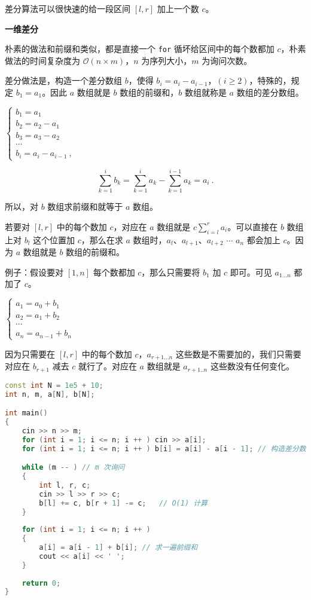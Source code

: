 
差分算法可以很快速的给一段区间 $[l, r]$ 加上一个数 $c$。

\textbf{一维差分}

朴素的做法和前缀和类似，都是直接一个 \verb|for| 循坏给区间中的每个数都加 $c$，朴素做法的时间复杂度为 $\mathcal{O}(n \times m)$，$n$ 为序列大小，$m$ 为询问次数。

差分做法是，构造一个差分数组 $b$，使得 $b_i = a_i - a_{i - 1}$，$(i \geq 2)$，特殊的，规定 $b_1 = a_1$。因此 $a$ 数组就是 $b$ 数组的前缀和，$b$ 数组就称是 $a$ 数组的差分数组。

$\begin{cases}
b_1 = a_1 \\
b_2 = a_2 - a_1 \\
b_3 = a_3 - a_2 \\
\cdots \\
b_i = a_i - a_{i - 1}~,
\end{cases}$

\begin{equation}
\sum^i_{k = 1}b_k = \sum^{i}_{k = 1} a_k - \sum^{i - 1}_{k = 1} a_k = a_i~.
\end{equation}

所以，对 $b$ 数组求前缀和就等于 $a$ 数组。

若要对 $[l, r]$ 中的每个数加 $c$，对应在 $a$ 数组就是 $c\sum^r_{i= l}a_i$。可以直接在 $b$ 数组上对 $b_l$ 这个位置加 $c$，那么在求 $a$ 数组时，$a_l$、$a_{l + 1}$、$a_{l + 2}$ $\cdots$ $a_n$ 都会加上 $c$。因为 $a$ 数组就是 $b$ 数组的前缀和。

例子：假设要对 $[1, n]$ 每个数都加 $c$，那么只需要将 $b_1$ 加 $c$ 即可。可见 $a_{1 ... n}$ 都加了 $c$。

$\begin{cases}
a_1 = a_0 + b_1 \\
a_2 = a_1 + b_2 \\
\cdots \\ 
a_n = a_{n - 1} + b_n
\end{cases}$

因为只需要在 $[l, r]$ 中的每个数加 $c$，$a_{r + 1 ... n}$ 这些数是不需要加的，我们只需要对应在 $b_{r + 1}$ 减去 $c$ 就行了。对应在 $a$ 数组就是 $a_{r + 1..n}$ 这些数没有任何变化。

\begin{lstlisting}[language=cpp]
const int N = 1e5 + 10;
int n, m, a[N], b[N];

int main() 
{
    cin >> n >> m;  
    for (int i = 1; i <= n; i ++ ) cin >> a[i];
    for (int i = 1; i <= n; i ++ ) b[i] = a[i] - a[i - 1]; // 构造差分数组

    while (m -- ) // m 次询问
    {
        int l, r, c;
        cin >> l >> r >> c;
        b[l] += c, b[r + 1] -= c;   // O(1) 计算
    }
    
    for (int i = 1; i <= n; i ++ ) 
    {
        a[i] = a[i - 1] + b[i]; // 求一遍前缀和
        cout << a[i] << ' ';   
    }
    
    return 0;
}
\end{lstlisting}

